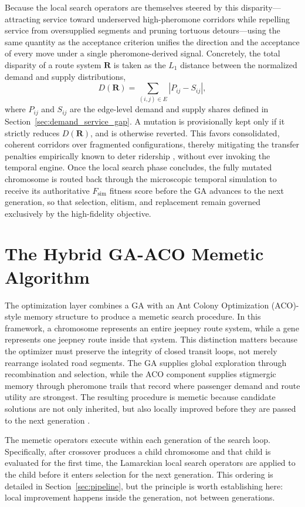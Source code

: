 {{Because the local search operators are themselves steered by this disparity---attracting service toward underserved high-pheromone corridors while repelling service from oversupplied segments and pruning tortuous detours---using the same quantity as the acceptance criterion unifies the direction and the acceptance of every move under a single pheromone-derived signal. Concretely, the total disparity of a route system $\mathbf{R}$ is taken as the $L_1$ distance between the normalized demand and supply distributions,
\[
D(\mathbf{R}) = \sum_{(i,j)\in E} \left| P_{ij} - S_{ij} \right|,
\]
where $P_{ij}$ and $S_{ij}$ are the edge-level demand and supply shares defined in Section~\ref{sec:demand_service_gap}. A mutation is provisionally kept only if it strictly reduces $D(\mathbf{R})$, and is otherwise reverted. This favors consolidated, coherent corridors over fragmented configurations, thereby mitigating the transfer penalties empirically known to deter ridership \citep{iseki2009transfers}, without ever invoking the temporal engine. Once the local search phase concludes, the fully mutated chromosome is routed back through the microscopic temporal simulation to receive its authoritative $F_{\text{sim}}$ fitness score before the \ac{GA} advances to the next generation, so that selection, elitism, and replacement remain governed exclusively by the high-fidelity objective.

\section{The Hybrid GA-ACO Memetic Algorithm}
\noindent
The optimization layer combines a \ac{GA} with an Ant Colony
Optimization (ACO)-style memory structure to produce a memetic search procedure. In this framework, a chromosome represents an entire jeepney route system, while a gene represents one jeepney route inside that system. This distinction matters because the optimizer must preserve the integrity of closed transit loops, not merely rearrange isolated road segments. The \ac{GA} supplies global exploration through recombination and selection, while the ACO component supplies stigmergic
memory through pheromone trails that record where passenger demand and route utility are strongest. The resulting procedure is memetic because candidate solutions are not only inherited, but also locally improved before they are passed to the next generation \citep{moscato1989evolution, moscato2003memetic}.

The memetic operators execute within each generation of the search loop.
Specifically, after crossover produces a child chromosome and that child is evaluated for the first time, the Lamarckian local search operators are applied to the child before it enters selection for the next generation. This ordering is detailed in Section~\ref{sec:pipeline}, but the principle is worth establishing here: local improvement happens inside the generation, not between
generations.

}}
